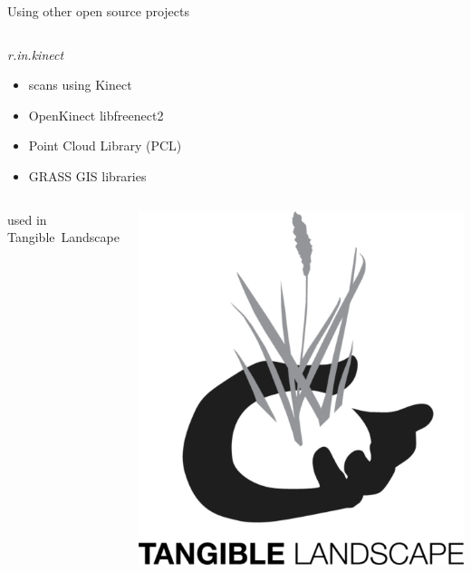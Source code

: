 \documentclass[xcolor={dvipsnames,usenames},beamer,aspectratio=169]{beamer}
\newcommand{\module}[1]{\emph{#1}}
\begin{document}
\begin{frame}{Using other open source projects}

\begin{columns}
\begin{column}{0.5\textwidth}

\begin{block}{\module{r.in.kinect}}
 \begin{itemize}
  \item scans using Kinect
  \item OpenKinect libfreenect2
  \item Point Cloud Library (PCL)
  \item GRASS GIS libraries
 \end{itemize}
\end{block}

\begin{columns}
\begin{column}{0.6\textwidth}
\small

used in Tangible~Landscape

\end{column}
\begin{column}{0.2\textwidth}

\includegraphics[width=\textwidth]{logos/tangible_landscape}


\end{column}
\end{columns}
\end{column}
\end{columns}
\end{frame}
\end{document}
